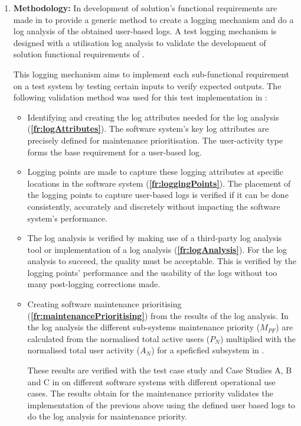 \begin{enumerate}[label=\textbf{\Roman*.}]
	\item \textbf{Methodology:} In  development of solution's functional requirements are made in  to provide a generic method to create a logging mechanism and do a log analysis of the obtained user-based logs. A test logging mechanism is designed with a utilisation log analysis to validate the development of solution functional requirements of .\par This logging mechanism aims to implement each sub-functional requirement on a test system by testing certain inputs to verify expected outputs. The following validation method was used for this test implementation in :
		\begin{itemize}
			\item Identifying and creating the log attributes needed for the log analysis (\textbf{\ref{fr:logAttributes}}). The software system's key log attributes are precisely defined for maintenance prioritisation. The user-activity type forms the base requirement for a user-based log.
			
			\item Logging points are made to capture these logging attributes at specific locations in the software system (\textbf{\ref{fr:loggingPoints}}). The placement of the logging points to capture user-based logs is verified if it can be done consistently, accurately and discretely without impacting the software system's performance. 
			
			\item The log analysis is verified by making use of a third-party log analysis tool or implementation of a log analysis (\textbf{\ref{fr:logAnalysis}}). For the log analysis to succeed, the quality must be acceptable. This is verified by the logging points' performance and the usability of the logs without too many post-logging corrections made.
			
			\item Creating software maintenance prioritising (\textbf{\ref{fr:maintenancePrioritising}}) from the results of the log analysis. In the log analysis the different sub-systems maintenance priority ($M_{PF}$) are calculated from the normalised total active users ($P_N$) multiplied with the normalised total user activity ($A_N$) for a speficfied subsystem in .\par These results are verified with the test case study and Case Studies A, B and C in  on different software systems with different operational use cases. The results obtain for the maintenance prriority validates the implementation of the previous above using the defined user based logs to do the log analysis for maintenance priority. 
		\end{itemize}


\end{enumerate}

